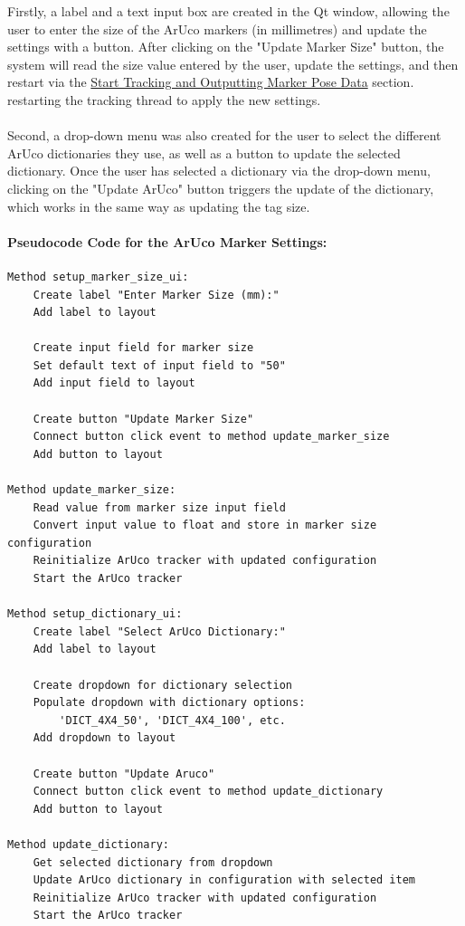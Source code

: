 \documentclass[12pt]{article}
\begin{document}
\begin{enumerate}
\begin{enumerate}
                        Firstly, a label and a text input box are created in the Qt window, allowing the user to enter the size of the ArUco markers (in millimetres) and update the settings with a button. After clicking on the "Update Marker Size" button, the system will read the size value entered by the user, update the settings, and then restart via the \hyperref[sec:tracking]{Start Tracking and Outputting Marker Pose Data} section. restarting the tracking thread to apply the new settings.
                        \\\\
                        Second, a drop-down menu was also created for the user to select the different ArUco dictionaries they use, as well as a button to update the selected dictionary. Once the user has selected a dictionary via the drop-down menu, clicking on the "Update ArUco" button triggers the update of the dictionary, which works in the same way as updating the tag size.
                        \paragraph{Pseudocode Code for the ArUco Marker Settings:}
                        \begin{verbatim}
Method setup_marker_size_ui:
    Create label "Enter Marker Size (mm):"
    Add label to layout

    Create input field for marker size
    Set default text of input field to "50"
    Add input field to layout

    Create button "Update Marker Size"
    Connect button click event to method update_marker_size
    Add button to layout

Method update_marker_size:
    Read value from marker size input field
    Convert input value to float and store in marker size configuration
    Reinitialize ArUco tracker with updated configuration
    Start the ArUco tracker

Method setup_dictionary_ui:
    Create label "Select ArUco Dictionary:"
    Add label to layout

    Create dropdown for dictionary selection
    Populate dropdown with dictionary options:
        'DICT_4X4_50', 'DICT_4X4_100', etc.
    Add dropdown to layout

    Create button "Update Aruco"
    Connect button click event to method update_dictionary
    Add button to layout

Method update_dictionary:
    Get selected dictionary from dropdown
    Update ArUco dictionary in configuration with selected item
    Reinitialize ArUco tracker with updated configuration
    Start the ArUco tracker


\end{verbatim}
\end{enumerate}
\end{enumerate}
\end{document}
